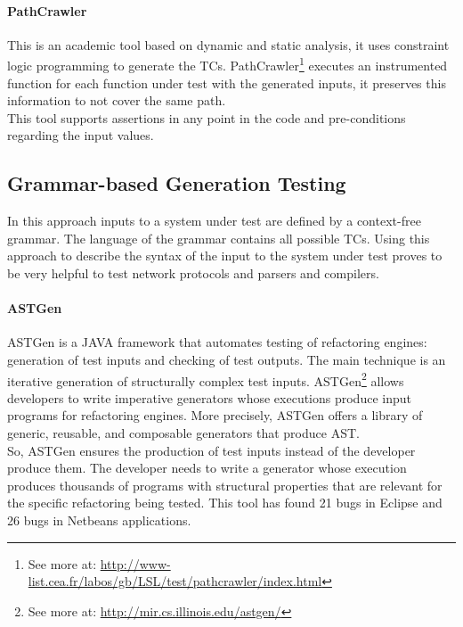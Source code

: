 \paragraph{PathCrawler} This is an academic tool based on dynamic and static analysis\cite{Williams05pathcrawler:automatic}, 
it uses constraint logic programming to generate the \ac{TC}s. PathCrawler\footnote{See more at: \url{http://www-list.cea.fr/labos/gb/LSL/test/pathcrawler/index.html}} executes an instrumented function for each function under test
with the generated inputs, it preserves this information to not cover the same path.\\
This tool supports assertions in any point in the code and pre-conditions regarding the input values.

\subsection{Grammar-based Generation Testing}
In this approach inputs to a system under test are defined by a context-free grammar. The language of the grammar contains all possible \ac{TC}s.
Using this approach to describe the syntax of the input to the system under test proves to be very helpful to test
network protocols\cite{tal:syntax-based,kaksonen2001functional} and parsers and compilers\cite{1994-burgess,Burgess_Saidi_1996}.

\paragraph{ASTGen}
ASTGen\cite{Daniel:2007:ATR:1287624.1287651} is a JAVA framework that automates testing of refactoring engines: generation of test inputs
and checking of test outputs. The main technique is an iterative generation of structurally complex test inputs.
ASTGen\footnote{See more at: \url{http://mir.cs.illinois.edu/astgen/}} allows developers to write imperative generators whose executions
produce input programs for refactoring engines. More precisely, ASTGen
offers a library of generic, reusable, and composable generators that produce \ac{AST}.\\
So, ASTGen ensures the production of test inputs instead of the developer produce them. The developer needs to write a generator whose execution
produces thousands of programs with structural properties that are relevant for the specific refactoring being tested. This tool has found
21 bugs in Eclipse and 26 bugs in Netbeans applications.

